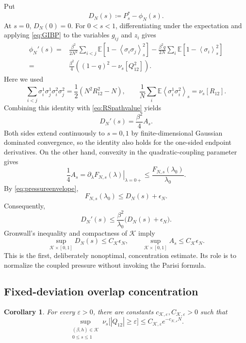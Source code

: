 \documentclass[11pt]{article}
\newtheorem{corollary}[theorem]{Corollary}
\numberwithin{equation}{section}
\newcommand{\E}{\mathbb{E}}
\newcommand{\1}{\mathbf 1}
\newcommand{\cK}{\mathcal K}
\newcommand{\braket}[1]{\left\langle #1\right\rangle}
\begin{document}
Put
\begin{equation}
 D_N(s)\coloneqq P_s^*-\phi_N(s).
 \label{eq:DN}
\end{equation}
At $s=0$, $D_N(0)=0$.  For $0<s<1$, differentiating under the
expectation and applying \eqref{eq:GIBP} to the variables $g_{ij}$ and
$z_i$ gives
\begin{align*}
 \phi_N'(s)
 ={}&\frac{\beta^2}{2N^2}\sum_{i<j}
 \E\left[1-\braket{\sigma_i\sigma_j}_s^2\right]
 -\frac{\beta^2q}{2N}\sum_i
 \E\left[1-\braket{\sigma_i}_s^2\right]\\
 ={}&\frac{\beta^2}{4}
 \left((1-q)^2-\nu_s[Q_{12}^2]\right).
\end{align*}
Here we used
\[
 \sum_{i<j}\sigma_i^1\sigma_j^1\sigma_i^2\sigma_j^2
 =\frac12(N^2R_{12}^2-N),
 \qquad
 \frac1N\sum_i\E\braket{\sigma_i^1\sigma_i^2}_s
 =\nu_s[R_{12}].
\]
Combining this identity with \eqref{eq:RSpathvalue} yields
\begin{equation}
 D_N'(s)=\frac{\beta^2}{4}A_s.
 \label{eq:DNprime}
\end{equation}
Both sides extend continuously to $s=0,1$ by finite-dimensional
Gaussian dominated convergence, so the identity also holds for the
one-sided endpoint derivatives.
On the other hand, convexity in the quadratic-coupling parameter gives
\[
 \frac14A_s
 =\left.\partial_\lambda F_{N,s}(\lambda)\right|_{\lambda=0+}
 \le\frac{F_{N,s}(\lambda_0)}{\lambda_0}.
\]
By \eqref{eq:pressureenvelope},
\[
 F_{N,s}(\lambda_0)
 \le D_N(s)+\epsilon_N.
\]
Consequently,
\begin{equation}
 D_N'(s)
 \le\frac{\beta^2}{\lambda_0}
 \bigl(D_N(s)+\epsilon_N\bigr).
 \label{eq:gronwallDN}
\end{equation}
Gronwall's inequality and compactness of $\cK$ imply
\begin{equation}
 \sup_{\cK\times[0,1]}D_N(s)\le C_{\cK}\epsilon_N,
 \qquad
 \sup_{\cK\times[0,1]}A_s\le C_{\cK}\epsilon_N.
 \label{eq:preconcentration}
\end{equation}
This is the first, deliberately nonoptimal, concentration estimate.
Its role is to normalize the coupled pressure without invoking the
Parisi formula.

\subsection{Fixed-deviation overlap concentration}\label{subsec:tails}

\begin{corollary}
\label{cor:tail}
For every $\varepsilon>0$, there are constants
$c_{\cK,\varepsilon},C_{\cK,\varepsilon}>0$ such that
\begin{equation}
 \sup_{\substack{(\beta,h)\in\cK\\0\le s\le1}}
 \nu_s\bigl[|Q_{12}|\ge\varepsilon\bigr]
 \le C_{\cK,\varepsilon}e^{-c_{\cK,\varepsilon}N}.
 \label{eq:tail}
\end{equation}
\end{corollary}
\end{document}
